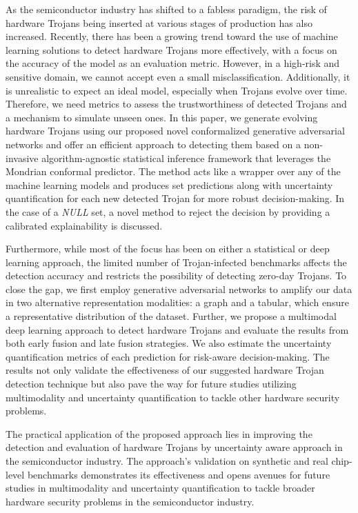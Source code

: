 \begingroup
\RaggedRight

As the semiconductor industry has shifted to a fabless paradigm, the risk of hardware Trojans being inserted at various stages of production has also increased. Recently, there has been a growing trend toward the use of machine learning solutions to detect hardware Trojans more effectively, with a focus on the accuracy of the model as an evaluation metric. However, in a high-risk and sensitive domain, we cannot accept even a small misclassification. Additionally, it is unrealistic to expect an ideal model, especially when Trojans evolve over time. Therefore, we need metrics to assess the trustworthiness of detected Trojans and a mechanism to simulate unseen ones. In this paper, we generate evolving hardware Trojans using our proposed novel conformalized generative adversarial networks and offer an efficient approach to detecting them based on a non-invasive algorithm-agnostic statistical inference framework that leverages the Mondrian conformal predictor. The method acts like a wrapper over any of the machine learning models and produces set predictions along with uncertainty quantification for each new detected Trojan for more robust decision-making. In the case of a \textit{NULL} set, a novel method to reject the decision by providing a calibrated explainability is discussed. 

Furthermore, while most of the focus has been on either a statistical or deep learning approach, the limited number of Trojan-infected benchmarks affects the detection accuracy and restricts the possibility of detecting zero-day Trojans. To close the gap, we first employ generative adversarial networks to amplify our data in two alternative representation modalities: a graph and a tabular, which ensure a representative distribution of the dataset. Further, we propose a multimodal deep learning approach to detect hardware Trojans and evaluate the results from both early fusion and late fusion strategies. We also estimate the uncertainty quantification metrics of each prediction for risk-aware decision-making. The results not only validate the effectiveness of our suggested hardware Trojan detection technique but also pave the way for future studies utilizing multimodality and uncertainty quantification to tackle other hardware security problems.

The practical application of the proposed approach lies in improving the detection and evaluation of hardware Trojans by uncertainty aware approach in the semiconductor industry. The approach's validation on synthetic and real chip-level benchmarks demonstrates its effectiveness and opens avenues for future studies in multimodality and uncertainty quantification to tackle broader hardware security problems in the semiconductor industry.

\endgroup